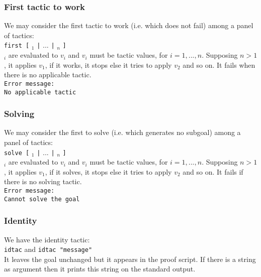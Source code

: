 \subsubsection{First tactic to work}

We may consider the first tactic to work (i.e. which does not fail) among a
panel of tactics:\\

{\tt first [} {\tacexpr}$_1$ {\tt |} $...$ {\tt |} {\tacexpr}$_n$ {\tt ]}\\

{\tacexpr}$_i$ are evaluated to $v_i$ and $v_i$ must be tactic values, for 
$i=1,...,n$. Supposing $n>1$, it applies $v_1$, if it works, it stops else it
tries to apply $v_2$ and so on. It fails when there is no applicable tactic.\\

{\tt Error message:}\\

{\tt No applicable tactic}

\subsubsection{Solving}

We may consider the first to solve (i.e. which generates no subgoal) among a
panel of tactics:\\

{\tt solve [} {\tacexpr}$_1$ {\tt |} $...$ {\tt |} {\tacexpr}$_n$ {\tt ]}\\

{\tacexpr}$_i$ are evaluated to $v_i$ and $v_i$ must be tactic values, for 
$i=1,...,n$. Supposing $n>1$, it applies $v_1$, if it solves, it stops else it
tries to apply $v_2$ and so on. It fails if there is no solving tactic.\\

{\tt Error message:}\\

{\tt Cannot solve the goal}

\subsubsection{Identity}

We have the identity tactic:\\

{\tt idtac} and {\tt idtac "message"}\\

It leaves the goal unchanged but it appears in the proof script.
If there is a string as argument then it prints this string on the
standard output. 

